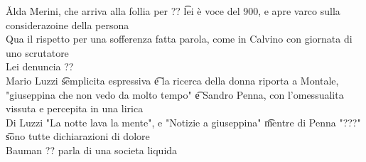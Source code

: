 \documentclass[12pt]{article}
\begin{document}
\v

Alda Merini, che arriva alla follia per ?? \t lei è voce del 900, e apre varco sulla considerazoine della persona \\
Qua il rispetto per una sofferenza fatta parola, come in Calvino con giornata di uno scrutatore \\
Lei denuncia ?? \\
Mario Luzzi \t semplicita espressiva \t e la ricerca della donna riporta a Montale, "giuseppina che non vedo da molto tempo" \t e Sandro Penna, con l'omessualita vissuta e percepita in una lirica \\
Di Luzzi "La notte lava la mente", e "Notizie a giuseppina" \t mentre di Penna "???" \t sono tutte dichiarazioni di dolore \\
Bauman ?? parla di una societa liquida
\end{document}

